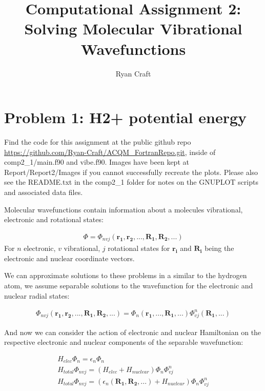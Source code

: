 \documentclass{article}
\renewcommand{\vec}[1]{\mathbf{#1}}
\begin{document}
\noindent
	\title{Computational Assignment 2: Solving Molecular Vibrational Wavefunctions}
	\author{Ryan Craft}
    \maketitle 
    
    \section{Problem 1: H2+ potential energy}
    Find the code for this assignment at the public github repo \url{https://github.com/Ryan-Craft/ACQM_FortranRepo.git}, inside of comp2\_1/main.f90 and vibe.f90. Images have been kept at Report/Report2/Images if you cannot successfully recreate the plots. Please also see the README.txt in the comp2\_1 folder for notes on the GNUPLOT scripts and associated data files.
    
    Molecular wavefunctions contain information about a molecules vibrational, electronic and rotational states:
    
    \begin{gather}
    	\Phi = \Phi_{nvj}(\vec{r_1},\vec{r_2},...,\vec{R_1},\vec{R_2},...)
    \end{gather}
    For $n$ electronic, $v$ vibrational, $j$ rotational states for $\vec{r_i}$ and $\vec{R_i}$ being the electronic and nuclear coordinate vectors.
    
    We can approximate solutions to these problems in a similar to the hydrogen atom, we assume separable solutions to the wavefunction for the electronic and nuclear radial states:
    
    \begin{gather}
    	\Phi_{nvj}(\vec{r_1},\vec{r_2},...,\vec{R_1},\vec{R_2},...) = \Phi_{n}(\vec{r_1},...,\vec{R_1},...)\Phi_{vj}^{n}(\vec{R_1},...)
    \end{gather}
    
    And now we can consider the action of electronic and nuclear Hamiltonian on the respective electronic and nuclear components of the separable wavefunction:
    
    \begin{gather}
    	H_{elec}\Phi_{n} = \epsilon_n\Phi_{n}\\
    	H_{total}\Phi_{nvj} = (	H_{elec} + H_{nuclear})\Phi_{n}\Phi_{vj}^{n}\\
    	H_{total}\Phi_{nvj} = (\epsilon_n(\vec{R_1},\vec{R_2},...) + H_{nuclear})\Phi_{n}\Phi_{vj}^{n}
    \end{gather}
    
\end{document}
